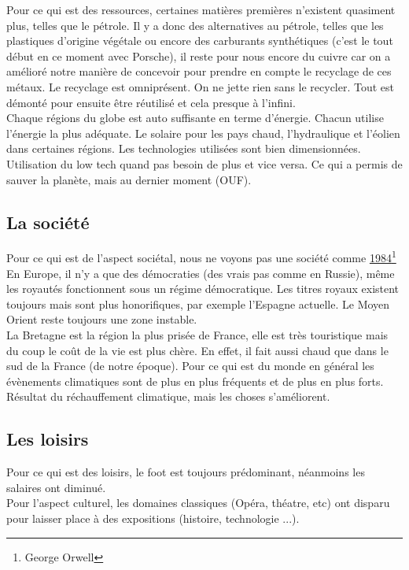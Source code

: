 Pour ce qui est des ressources,  certaines matières premières n’existent quasiment plus, telles que le pétrole. Il y a donc des alternatives au pétrole, telles que les plastiques d’origine végétale ou encore des carburants synthétiques (c'est le tout début en ce moment avec Porsche), il reste pour nous encore du cuivre car on a amélioré notre manière de concevoir pour prendre en compte le recyclage de ces métaux.
Le recyclage est omniprésent. On ne jette rien sans le recycler. Tout est démonté pour ensuite être réutilisé et cela presque à l’infini.\\



Chaque régions du globe est auto suffisante en terme d’énergie. Chacun utilise l’énergie la plus adéquate. Le solaire pour les pays chaud, l’hydraulique et l’éolien dans certaines régions. Les technologies utilisées sont bien dimensionnées. Utilisation du low tech quand pas besoin de plus et vice versa. Ce qui a permis de sauver la planète, mais au dernier moment (OUF).


\subsection{La société}

Pour ce qui est de l'aspect sociétal, nous ne voyons pas une société comme \underline{1984}\footnote{George Orwell}\\
En Europe, il n'y a que des démocraties (des vrais pas comme en Russie), même les royautés fonctionnent sous un régime démocratique. Les titres royaux existent toujours mais sont plus honorifiques, par exemple l'Espagne actuelle. 
Le Moyen Orient reste toujours une zone instable.\\


La Bretagne est la région la plus prisée de France, elle est très touristique mais du coup le coût de la vie est plus chère. En effet, il fait aussi chaud que dans le sud de la France (de notre époque). Pour ce qui est du monde en général les évènements climatiques sont de plus en plus fréquents et de plus en plus forts. Résultat du réchauffement climatique, mais les choses s'améliorent.

\subsection{Les loisirs}

Pour ce qui est des loisirs, le foot est toujours prédominant, néanmoins les salaires ont diminué.\\ 
Pour l'aspect culturel, les domaines classiques (Opéra, théatre, etc) ont disparu pour laisser place à des expositions (histoire, technologie ...).\\

